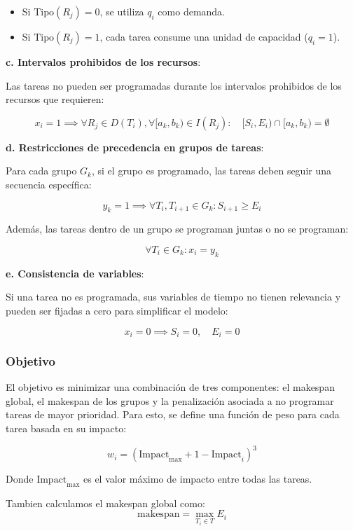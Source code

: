 \documentclass{article}
\begin{document}
\begin{itemize}
    \item Si \( \text{Tipo}(R_j) = 0 \), se utiliza \( q_i \) como demanda.
    \item Si \( \text{Tipo}(R_j) = 1 \), cada tarea consume una unidad de capacidad (\( q_i = 1 \)).
\end{itemize}

\textbf{c. Intervalos prohibidos de los recursos}:

Las tareas no pueden ser programadas durante los intervalos prohibidos de los recursos que requieren:

\[
x_i = 1 \implies \forall R_j \in D(T_i), \forall [a_k, b_k) \in I(R_j): \quad [S_i, E_i) \cap [a_k, b_k) = \emptyset
\]

\textbf{d. Restricciones de precedencia en grupos de tareas}:

Para cada grupo \( G_k \), si el grupo es programado, las tareas deben seguir una secuencia específica:

\[
y_k = 1 \implies \forall T_i, T_{i+1} \in G_k: S_{i+1} \geq E_i
\]

Además, las tareas dentro de un grupo se programan juntas o no se programan:

\[
\forall T_i \in G_k: x_i = y_k
\]

\textbf{e. Consistencia de variables}:

Si una tarea no es programada, sus variables de tiempo no tienen relevancia y pueden ser fijadas a cero para simplificar el modelo:

\[
x_i = 0 \implies S_i = 0, \quad E_i = 0
\]

\vspace{0.5cm}

\subsubsection{Objetivo}

El objetivo es minimizar una combinación de tres componentes: el makespan global, el makespan de los grupos y la penalización asociada a no programar tareas de mayor prioridad. Para esto, se define una función de peso para cada tarea basada en su impacto:

\[
w_i = (\text{Impact}_{\text{max}} + 1 - \text{Impact}_i)^3
\]

Donde \( \text{Impact}_{\text{max}} \) es el valor máximo de impacto entre todas las tareas.

Tambien calculamos el makespan global como:
\[
\text{makespan} = \max_{T_i \in T} E_i
\]
\end{document}

